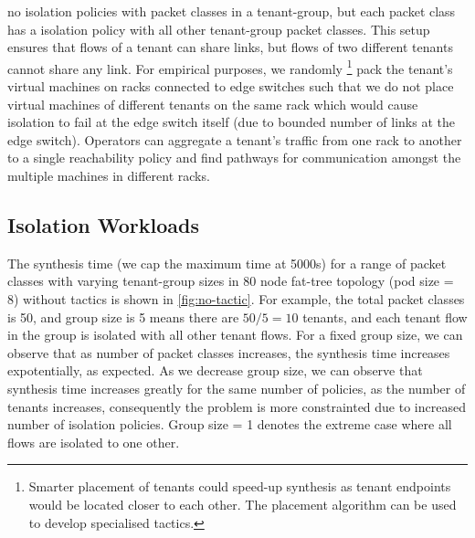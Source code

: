 no isolation policies with packet classes in a tenant-group, but each packet class
has a isolation policy with all other tenant-group packet classes. This setup ensures
that flows of a tenant can share links, but flows of two different tenants cannot share
any link. 
For empirical purposes, 
we randomly
\footnote{Smarter placement of tenants could speed-up synthesis as tenant endpoints would
	be located closer to each other. The placement algorithm can be used to develop specialised tactics.}
  pack the tenant's virtual machines on racks connected to edge switches such that
   we do not place virtual machines of different tenants on the same rack which would 
   cause isolation to fail at the edge switch itself (due to bounded number of links at
   the edge switch). Operators can aggregate a tenant's traffic from one rack to
another to a single reachability policy and find pathways for communication amongst the multiple
machines in different racks. 
\subsection{Isolation Workloads}
The synthesis time (we cap the maximum time at 5000s) for a range of
 packet classes with varying tenant-group sizes in 80 node fat-tree topology (pod size = 8) 
 without tactics is shown in \cref{fig:no-tactic}. For example, the total packet classes is 50, and group size is 5 means there
  are $50/5 = 10$ tenants, and each tenant flow in the group is isolated with all other tenant
   flows. For a fixed group size, we can observe that as number of packet classes increases,
    the synthesis time increases expotentially, as expected. As we decrease group size,
     we can observe that synthesis time increases greatly for the same number of policies,
      as the number of tenants increases, consequently the problem is more constrainted 
      due to increased number of isolation policies. 
      Group size = 1 denotes the extreme case where all flows are isolated to one other. 
      

